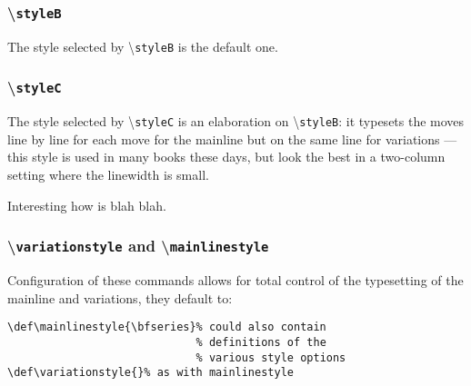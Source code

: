 \documentclass[10pt]{article}
\newcommand{\command}[1]{\textbackslash\texttt{#1}}
\begin{document}
\begin{LTXexample}
\newgame
\styleA

\end{LTXexample}


\subsubsection{\command{styleB}}
\label{sec:styleb}

The style selected by \command{styleB} is the default one.

\begin{LTXexample}
\newgame
\styleB

\end{LTXexample}


\subsubsection{\command{styleC}}
\label{sec:styleb}

The style selected by \command{styleC} is an elaboration on
\command{styleB}: it typesets the moves line by line for each move for
the mainline but on the same line for variations --- this style is
used in many books these days, but look the best in a two-column
setting where the linewidth is small.

\begin{LTXexample}
\newgame
\styleC


Interesting how  is blah blah.
\end{LTXexample}

\styleB


\subsubsection{\command{variationstyle} and  \command{mainlinestyle}}
\label{sec:variationstyle}

Configuration of these commands allows for total control of the
typesetting of the mainline and variations, they default to:

\begin{verbatim}
\def\mainlinestyle{\bfseries}% could also contain
                             % definitions of the
                             % various style options
\def\variationstyle{}% as with mainlinestyle
\end{verbatim}
\end{document}
